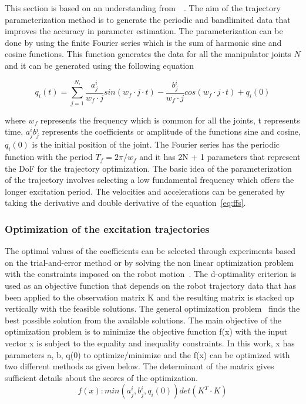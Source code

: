 This section is based on an understanding from~\cite{SweversJ1997Orea}~\cite{swevers}.
The aim of the trajectory parameterization method is to generate the periodic and bandlimited data that improves the accuracy in parameter estimation. The parameterization can be done by using the finite Fourier series which is the sum of harmonic sine and cosine functions. This function generates the data for all the manipulator joints $N$ and it can be generated using the following equation

\begin{equation}
q_i(t) = \sum_{j=1}^{N_i} \frac{a{_j^i}}{w_f\cdot j} sin(w_f\cdot j\cdot t) - \frac{b{_j^i}}{w_f\cdot j} cos(w_f\cdot j\cdot t) + q_i(0)
\label{eq:ffs}
\end{equation}

where $w_f$ represents the frequency which is common for all the joints, t represents time, $a{_j^i} b{_j^i}$ represents the coefficients or amplitude of the functions sine and cosine, $q_i(0)$ is the initial position of the joint. The Fourier series has the periodic function with the period $T_f = 2\pi/w_f$ and it has 2N + 1 parameters that represent the DoF for the trajectory optimization. The basic idea of the parameterization of the trajectory involves selecting a low fundamental frequency which offers the longer excitation period. The velocities and accelerations can be generated by taking the derivative and double derivative of the equation~\eqref{eq:ffs}.

\subsubsection*{Optimization of the excitation trajectories}

The optimal values of the coefficients can be selected through experiments based on the trial-and-error method or by solving the non linear optimization problem with the constraints imposed on the robot motion~\cite{swevers}. The d-optimality criterion is used as an objective function that depends on the robot trajectory data that has been applied to the observation matrix K and the resulting matrix is stacked up vertically with the feasible solutions. The general optimization problem~\cite{boyd2004convex} finds the best possible solution from the available solutions. The main objective of the optimization problem is to minimize the objective function f(x) with the input vector x is subject to the equality and inequality constraints. In this work, x has parameters a, b, q(0) to optimize/minimize and the f(x) can be optimized with two different methods as given below. The determinant of the matrix gives sufficient details about the scores of the optimization. 
\begin{equation}
f(x) : min(a{_j^i}, b{_j^i}, q_i(0)) det(K^T\cdot K)
\end{equation}

